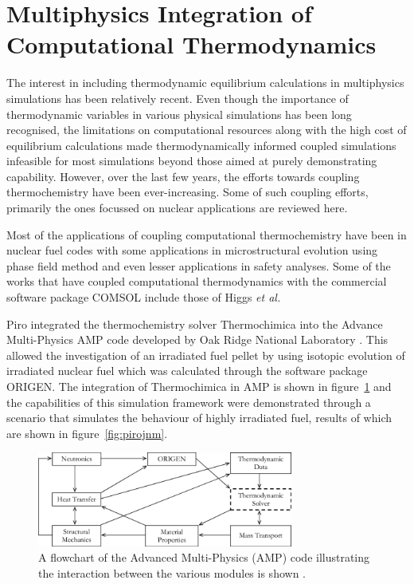 
\section{Multiphysics Integration of Computational Thermodynamics}


	The interest in including thermodynamic equilibrium calculations in multiphysics simulations has been relatively recent. Even though the importance of thermodynamic variables in various physical simulations has been long recognised, the limitations on computational resources along with the high cost of equilibrium calculations made thermodynamically informed coupled simulations infeasible for most simulations beyond those aimed at purely demonstrating capability. However, over the last few years, the efforts towards coupling thermochemistry have been ever-increasing. Some of such coupling efforts, primarily the ones focussed on nuclear applications are reviewed here. 
	
	Most of the applications of coupling computational thermochemistry have been in nuclear fuel codes with some applications in microstructural evolution using phase field method and even lesser applications in safety analyses. Some of the works that have coupled computational thermodynamics with the commercial software package COMSOL include those of Higgs \textit{et al.}
	
	
	Piro integrated the thermochemistry solver {Thermochimica} into the Advance Multi-Physics {AMP} code developed by Oak Ridge National Laboratory \cite{Piro11b}. This allowed the investigation of an irradiated fuel pellet by using isotopic evolution of irradiated nuclear fuel which was calculated through the software package {ORIGEN}. The integration of {Thermochimica} in {AMP} is shown in figure~\ref{fig:amp} and the capabilities of this simulation framework were demonstrated through a scenario that simulates the behaviour of highly irradiated  fuel, results of which are shown in figure~\ref{fig:pirojnm}.
	\begin{figure}[htbp]
		\begin{center}
		\includegraphics[width=0.75\textwidth]{figures/AMP_TC.png}
		\caption[A flowchart of the Advanced Multi-Physics (AMP) code illustrating the interaction between the various modules.]{A flowchart of the Advanced Multi-Physics (AMP) code illustrating the interaction between the various modules is shown \cite{Piro11b}.}
		\label{fig:amp}
		\end{center}
	\end{figure}

